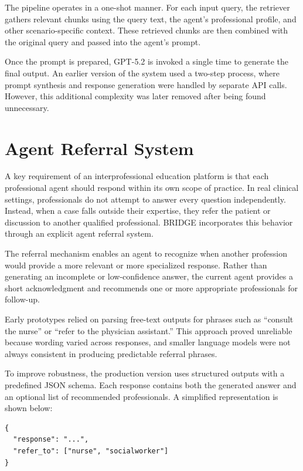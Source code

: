 \documentclass[12pt]{article}
\begin{document}
The pipeline operates in a one-shot manner. For each input query, the retriever gathers relevant chunks using the query text, the agent’s professional profile, and other scenario-specific context. These retrieved chunks are then combined with the original query and passed into the agent’s prompt.

Once the prompt is prepared, GPT-5.2 is invoked a single time to generate the final output. An earlier version of the system used a two-step process, where prompt synthesis and response generation were handled by separate API calls. However, this additional complexity was later removed after being found unnecessary.

\section{Agent Referral System}

A key requirement of an interprofessional education platform is that each professional agent should respond within its own scope of practice. In real clinical settings, professionals do not attempt to answer every question independently. Instead, when a case falls outside their expertise, they refer the patient or discussion to another qualified professional. BRIDGE incorporates this behavior through an explicit agent referral system.

The referral mechanism enables an agent to recognize when another profession would provide a more relevant or more specialized response. Rather than generating an incomplete or low-confidence answer, the current agent provides a short acknowledgment and recommends one or more appropriate professionals for follow-up.

Early prototypes relied on parsing free-text outputs for phrases such as ``consult the nurse'' or ``refer to the physician assistant.'' This approach proved unreliable because wording varied across responses, and smaller language models were not always consistent in producing predictable referral phrases.

To improve robustness, the production version uses structured outputs with a predefined JSON schema. Each response contains both the generated answer and an optional list of recommended professionals. A simplified representation is shown below:

\begin{verbatim}
{
  "response": "...",
  "refer_to": ["nurse", "socialworker"]
}
\end{verbatim}
\end{document}

